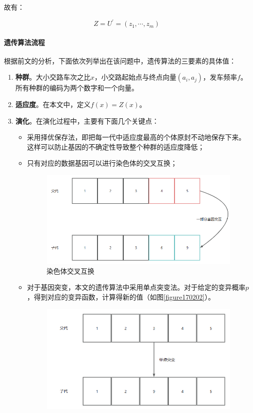 故有：

\begin{equation}
    Z = U^{'}=(z_1,\cdots,z_m)
\end{equation}

\paragraph{遗传算法流程}

根据前文的分析，下面依次列举出在该问题中，遗传算法的三要素的具体值：

\begin{enumerate}
    \item \textbf{种群}。大小交路车次之比$x$，小交路起始点与终点向量$(a_i, a_j)$，发车频率$f$。所有种群的编码为两个数字和一个向量。
    \item \textbf{适应度}。在本文中，定义$f(x)=Z(x)$。
    \item \textbf{演化}。在演化过程中，主要有下面几个关键点：
    \begin{itemize}
        \item 采用择优保存法，即把每一代中适应度最高的个体原封不动地保存下来。这样可以防止基因的不确定性导致整个种群的适应度降低；
        \item 只有对应的数据基因可以进行染色体的交叉互换；
        \begin{figure}[h]
            \centering
            \includegraphics[scale=0.4]{res/figure170220.png}
            \caption{染色体交叉互换}
            \label{figure170220}
        \end{figure}
        \item 对于基因突变，本文的遗传算法中采用单点突变法。对于给定的变异概率$p$，得到对应的变异函数，计算得新的值（如图\ref{figure170202}）。
        \begin{figure}[h]
            \centering
            \includegraphics[scale=0.4]{res/figure170202.png}

\end{figure}
\end{itemize}
\end{enumerate}
